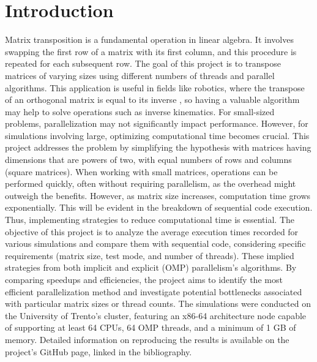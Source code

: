 \section{Introduction}
Matrix transposition is a fundamental operation in linear algebra. It involves swapping the first row of a matrix with its first column, and this procedure is repeated for each subsequent row.
The goal of this project is to transpose matrices of varying sizes using different numbers of threads and parallel algorithms. This application is useful in fields like robotics, where the transpose of an orthogonal matrix is equal to its inverse , so having a valuable algorithm may help to solve operations such as inverse kinematics.
For small-sized problems, parallelization may not significantly impact performance. However, for simulations involving large, optimizing computational time becomes crucial. This project addresses the problem by simplifying the hypothesis with matrices having dimensions that are powers of two, with equal numbers of rows and columns (square matrices).
When working with small matrices, operations can be performed quickly, often without requiring parallelism, as the overhead might outweigh the benefits. However, as matrix size increases, computation time grows exponentially. This will be evident in the breakdown of sequential code execution. Thus, implementing strategies to reduce computational time is essential.
The objective of this project is to analyze the average execution times recorded for various simulations and compare them with sequential code, considering specific requirements (matrix size, test mode, and number of threads). These implied strategies from both implicit and explicit (OMP) parallelism’s algorithms. By comparing speedups and efficiencies, the project aims to identify the most efficient parallelization method and investigate potential bottlenecks associated with particular matrix sizes or thread counts.
The simulations were conducted on the University of Trento's cluster, featuring an x86-64 architecture node capable of supporting at least 64 CPUs, 64 OMP threads, and a minimum of 1 GB of memory. Detailed information on reproducing the results is available on the project's GitHub page, linked in the bibliography. 
